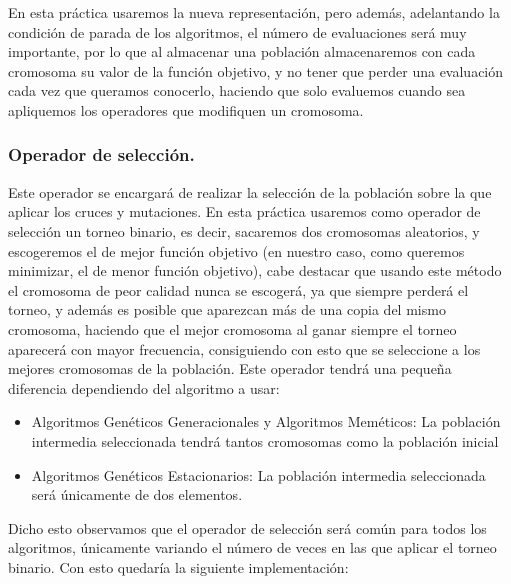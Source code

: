 \documentclass[12pt, spanish]{article}
\begin{document}
En esta práctica usaremos la nueva representación, pero además, adelantando la condición de parada de los algoritmos, el número de evaluaciones será muy importante, por lo que al almacenar una población almacenaremos con cada cromosoma su valor de la función objetivo, y no tener que perder una evaluación cada vez que queramos conocerlo, haciendo que solo evaluemos cuando sea apliquemos los operadores que modifiquen un cromosoma.

\subsubsection{Operador de selección.}

Este operador se encargará de realizar la selección de la población sobre la que aplicar los cruces y mutaciones. En esta práctica usaremos como operador de selección un torneo binario, es decir, sacaremos dos cromosomas aleatorios, y escogeremos el de mejor función objetivo (en nuestro caso, como queremos minimizar, el de menor función objetivo), cabe destacar que usando este método el cromosoma de peor calidad nunca se escogerá, ya que siempre perderá el torneo, y además es posible que aparezcan más de una copia del mismo cromosoma, haciendo que el mejor cromosoma al ganar siempre el torneo aparecerá con mayor frecuencia, consiguiendo con esto que se seleccione a los mejores cromosomas de la población. Este operador tendrá una pequeña diferencia dependiendo del algoritmo a usar:

\begin{itemize}
	\item Algoritmos Genéticos Generacionales y Algoritmos Meméticos: La población intermedia seleccionada tendrá tantos cromosomas como la población inicial
	\item Algoritmos Genéticos Estacionarios: La población intermedia seleccionada será únicamente de dos elementos.
\end{itemize}

Dicho esto observamos que el operador de selección será común para todos los algoritmos, únicamente variando el número de veces en las que aplicar el torneo binario. Con esto quedaría la siguiente implementación:
\end{document}
